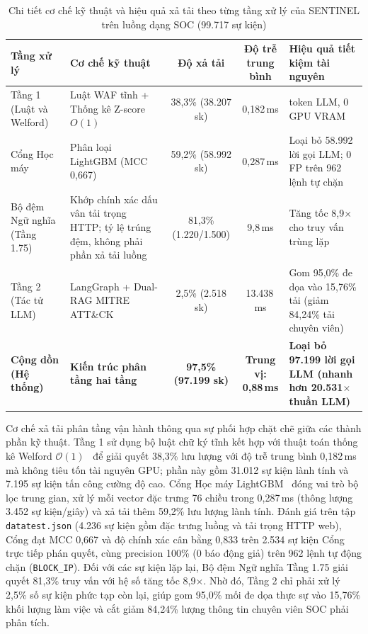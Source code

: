 \begin{table}[htbp]
\centering
\caption[Hiệu quả xả tải và độ trễ theo từng tầng xử lý]{Chi tiết cơ chế kỹ thuật và hiệu quả xả tải theo từng tầng xử lý của SENTINEL trên luồng dạng SOC (99.717 sự kiện)}
\label{tab:tier1_performance}
\footnotesize
\setlength{\tabcolsep}{4pt}
\begin{tabularx}{\textwidth}{>{\raggedright\arraybackslash}p{2.6cm} >{\raggedright\arraybackslash}X c c >{\raggedright\arraybackslash}p{3.2cm}}
\toprule
\textbf{Tầng xử lý} & \textbf{Cơ chế kỹ thuật} & \textbf{Độ xả tải} & \textbf{Độ trễ trung bình} & \textbf{Hiệu quả tiết kiệm tài nguyên} \\
\midrule
Tầng 1 (Luật và Welford) & Luật WAF tĩnh + Thống kê Z-score $O(1)$ & 38,3\% (38.207 sk) & 0,182\,ms & 0 token LLM, 0 GPU VRAM \\
Cổng Học máy & Phân loại LightGBM (MCC 0,667) & 59,2\% (58.992 sk) & 0,287\,ms & Loại bỏ 58.992 lời gọi LLM; 0 FP trên 962 lệnh tự chặn \\
Bộ đệm Ngữ nghĩa (Tầng 1.75) & Khớp chính xác dấu vân tải trọng HTTP; tỷ lệ trúng đệm, không phải phần xả tải luồng & 81,3\% (1.220/1.500) & 9,8\,ms & Tăng tốc 8,9$\times$ cho truy vấn trùng lặp \\
Tầng 2 (Tác tử LLM) & LangGraph + Dual-RAG MITRE ATT\&CK & 2,5\% (2.518 sk) & 13.438\,ms & Gom 95,0\% đe dọa vào 15,76\% tải (giảm 84,24\% tải chuyên viên) \\
\midrule
\textbf{Cộng dồn (Hệ thống)} & \textbf{Kiến trúc phân tầng hai tầng} & \textbf{97,5\% (97.199 sk)} & \textbf{Trung vị: 0,88\,ms} & \textbf{Loại bỏ 97.199 lời gọi LLM (nhanh hơn 20.531$\times$ thuần LLM)} \\
\bottomrule
\end{tabularx}
\end{table}

Cơ chế xả tải phân tầng vận hành thông qua sự phối hợp chặt chẽ giữa các thành phần kỹ thuật. Tầng 1 sử dụng bộ luật chữ ký tĩnh kết hợp với thuật toán thống kê Welford $\mathcal{O}(1)$~\cite{welford1962} để giải quyết 38,3\% lưu lượng với độ trễ trung bình 0,182\,ms mà không tiêu tốn tài nguyên GPU; phần này gồm 31.012 sự kiện lành tính và 7.195 sự kiện tấn công cường độ cao. Cổng Học máy LightGBM~\cite{ke2017lightgbm} đóng vai trò bộ lọc trung gian, xử lý mỗi vector đặc trưng 76 chiều trong 0,287\,ms (thông lượng 3.452 sự kiện/giây) và xả tải thêm 59,2\% lưu lượng lành tính. Đánh giá trên tập \texttt{datatest.json} (4.236 sự kiện gồm đặc trưng luồng và tải trọng HTTP web), Cổng đạt MCC 0,667 và độ chính xác cân bằng 0,833 trên 2.534 sự kiện Cổng trực tiếp phán quyết, cùng precision 100\% (0 báo động giả) trên 962 lệnh tự động chặn (\texttt{BLOCK\_IP}). Đối với các sự kiện lặp lại, Bộ đệm Ngữ nghĩa Tầng 1.75 giải quyết 81,3\% truy vấn với hệ số tăng tốc 8,9$\times$. Nhờ đó, Tầng 2 chỉ phải xử lý 2,5\% số sự kiện phức tạp còn lại, giúp gom 95,0\% mối đe dọa thực sự vào 15,76\% khối lượng làm việc và cắt giảm 84,24\% lượng thông tin chuyên viên SOC phải phân tích.


